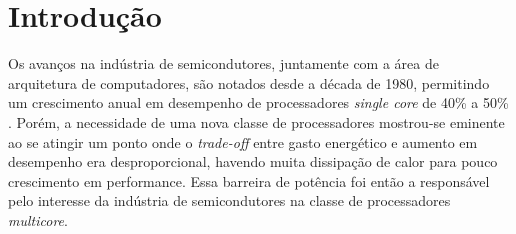 
\newcommand{\multicore}{\textit{multicore}\xspace}
\newcommand{\chip}{\textit{chip}\xspace}
\newcommand{\chips}{\textit{chips}\xspace}
\newcommand{\singlecore}{\textit{single core}\xspace}
\newcommand{\tradeoff}{\textit{trade-off}\xspace}
\newcommand{\exascale}{\textit{Exascale}\xspace}
\newcommand{\greencomputing}{\textit{Green Computing}\xspace}  
\newcommand{\ranking}{\textit{ranking}\xspace}
\newcommand{\benchs}{\textit{benchmarks}\xspace}
\newcommand{\etal}{\textit{et al}.\xspace}
\newcommand{\thread}{\textit{thread}\xspace}
\newcommand{\threads}{\textit{threads}\xspace}
\newcommand{\cache}{\textit{cache}\xspace}
\newcommand{\caches}{\textit{caches}\xspace}
\newcommand{\byte}{\textit{byte}\xspace}
\newcommand{\bytes}{\textit{bytes}\xspace}
\newcommand{\transistor}{\textit{transistor}\xspace}
\newcommand{\transistors}{\textit{transistors}\xspace}
\newcommand{\hardware}{\textit{hardware}\xspace}
\newcommand{\cluster}{\textit{cluster}\xspace}
\newcommand{\clusters}{\textit{clusters}\xspace}
\newcommand{\kernel}{\textit{kernel}\xspace}
\newcommand{\kernels}{\textit{kernels}\xspace}
\newcommand{\offset}{\textit{offset}\xspace}
\newcommand{\offsets}{\textit{offsets}\xspace}
\newcommand{\master}{\textit{master}\xspace}
\newcommand{\masters}{\textit{masters}\xspace}
\newcommand{\slave}{\textit{slave}\xspace}
\newcommand{\slaves}{\textit{slaves}\xspace}

\chapter{Introdução}
\label{ch:introdução}

Os avanços na indústria de semicondutores, juntamente com a área de arquitetura de computadores, são notados desde a década de 1980, permitindo um crescimento anual em desempenho de processadores \singlecore de 40\% a 50\% \cite{Larus2008}. Porém, a necessidade de uma nova classe de processadores mostrou-se eminente ao se atingir um ponto onde o \tradeoff entre gasto energético e aumento em desempenho era desproporcional, havendo muita dissipação de calor para pouco crescimento em performance. Essa barreira de potência foi então a responsável pelo interesse da indústria de semicondutores na classe de processadores \multicore. 

